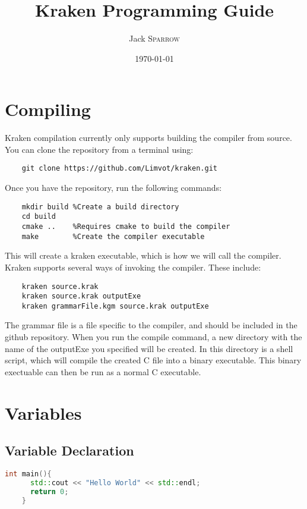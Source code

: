 \documentclass{article}
\title{Kraken Programming Guide} %
\author{Jack \textsc{Sparrow}} %
\date{\today} %
\begin{document}
\maketitle %

\section{Compiling}
  Kraken compilation currently only supports building the compiler from source.
You can clone the repository from a terminal using:
  \begin{lstlisting}
    git clone https://github.com/Limvot/kraken.git
  \end{lstlisting}
Once you have the repository, run the following commands:
  \begin{lstlisting}
    mkdir build %Create a build directory
    cd build
    cmake ..    %Requires cmake to build the compiler
    make        %Create the compiler executable
  \end{lstlisting}
This will create a kraken executable, which is how we will call the compiler.
Kraken supports several ways of invoking the compiler.  These include:
  \begin{lstlisting}
    kraken source.krak
    kraken source.krak outputExe
    kraken grammarFile.kgm source.krak outputExe
  \end{lstlisting}
The grammar file is a file specific to the compiler, and should be included
in the github repository.  When you run the compile command, a new directory
with the name of the outputExe you specified will be created.  In this directory
is a shell script, which will compile the created C file into a binary executable.
This binary exectuable can then be run as a normal C executable.


\section{Variables}
\label{sec:var}

\subsection{Variable Declaration}
  \begin{lstlisting}[language=C++]
    int main(){
      std::cout << "Hello World" << std::endl;
      return 0;
    }
  \end{lstlisting}
\end{document}
